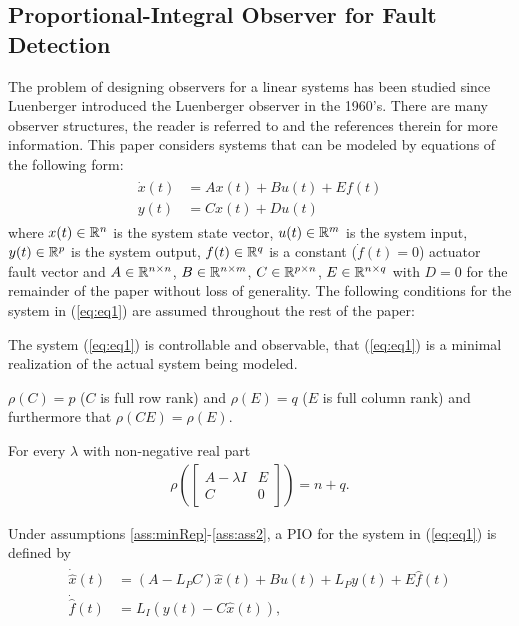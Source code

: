\documentclass[letterpaper, 11 pt, conference]{ieeeconf}  %
\begin{document}
\subsection{Proportional-Integral Observer for Fault Detection} 
The problem of designing observers for a linear systems has been studied since Luenberger introduced the Luenberger observer in the 1960's. There are many observer structures, the reader is referred to \cite{oreilly_observers_1983} and the references therein for more information. This paper considers systems that can be modeled by equations of the following form: 
\begin{gather}
\begin{aligned} \label{eq:eq1}
\dot{x}(t) &= Ax(t) + Bu(t) + E f (t) \\
y(t) &= Cx(t) + Du(t)
\end{aligned}
\end{gather}
where $x(t) \in \mathbb{R}^n$ is the system state vector, $u(t) \in \mathbb{R}^m$ is the system input, $y(t) \in \mathbb{R}^p$ is the system output, $f(t) \in \mathbb{R}^{q}$ is a constant (\ie $\dot{f}(t)=0$) actuator fault vector and $A \in \mathbb{R}^{n \times n}$, $B \in \mathbb{R}^{n \times m}$, $C \in \mathbb{R}^{p \times n}$, $E \in \mathbb{R}^{n \times q}$ with $D=0$ for the remainder of the paper without loss of generality. The following conditions for the system in (\ref{eq:eq1}) are assumed throughout the rest of the paper:
\begin{ass} \label{ass:minRep}
The system (\ref{eq:eq1}) is controllable and observable, \ie that (\ref{eq:eq1}) is a minimal realization of the actual system being modeled.
\end{ass}
\begin{ass} \label{ass:ass1}
$\rho(C) = p$ (\ie $C$ is full row rank) and $\rho(E) = q$ (\ie $E$ is full column rank) and furthermore that $\rho(CE) = \rho(E)$.
\end{ass}
\begin{ass} \label{ass:ass2}
For every $\lambda$ with non-negative real part 
\begin{align*}
\rho \left ( \left [ \begin{array}{cc} A-\lambda I&E \\ C&0 \end{array}\right ] \right )= n + q.
\end{align*}
\end{ass}
Under assumptions \ref{ass:minRep}-\ref{ass:ass2}, a PIO for the system in (\ref{eq:eq1}) is defined by 
\begin{gather}\label{eq:eq2}
\begin{aligned} 
\dot{\hat{x}}(t) &= (A-L_P C)\hat{x}(t) + Bu(t) + L_P y(t) + E \hat{f}(t) \\
\dot{\hat{f}}(t) &= L_I (y(t) - C\hat{x}(t)),
\end{aligned}
\end{gather}
\end{document}
